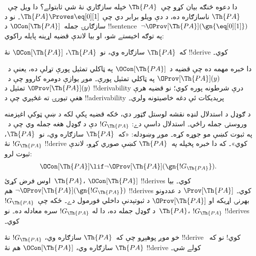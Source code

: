 \documentclass[../../../include/open-logic-section]{subfiles}
\begin{document}


دا دعوه څنګه بيان کړو چې~$\Th{PA}$ خپله سازګاري نۀ شي ثابتولے؟
دا ويل چې~$\Th{PA}$ ناسازګاره ده، د دې ويلو برابر دي چې
$\Th{PA} \Proves \eq[0][1]$۔ نو د سازګارۍ جمله~$\OCon[\Th{PA}]$
د !!{sentence}~$\lnot
\OProv[\Th{PA}](\gn{\eq[0][1]})$ په توګه اخيستے شو، او بيا
لاندې قضيه اړينه پايله راکوي:

\begin{thm}
که~$\Th{PA}$ سازګاره وي، نو~$\Th{PA}$،
$\OCon[\Th{PA}]$ نۀ !!{derive} کوي۔
\end{thm}

دا خبره مهمه ده چې قضيه د~$\OCon[\Th{PA}]$ په ټاکلي تمثيل پورې
تړلې ده، يعنې د~$\OProv[\Th{PA}](y)$ په ټاکلي تمثيل پورې۔ موږ
يوازې دومره کاروو چې د~$\OProv[\Th{PA}](y)$ تمثيل د
!!{derivability} درې شرطونه پوره کوي؛ نو قضيه هرې هغې تيورۍ ته
غځېږي چې د !!a{derivability} پريديکات ئې دغه خاصيتونه ولري۔

د ګوډل د استدلال لنډه نقشه لوستل ګټور دي، ځکه قضيه پکې لکه د ښې
ټوکې اغېزمنه وروستۍ جمله راځي۔ استدلال داسې دے: $!G_\Th{PA}$
دې د ګوډل هغه جمله وي چې د~
په ثبوت کښې مو جوړه کړه۔ موږ وښودله: «که~$\Th{PA}$ سازګاره وي،
نو~$\Th{PA}$، $!G_\Th{PA}$ نۀ !!{derive} کوي»۔ که دا خبره
پخپله \emph{په}~$\Th{PA}$ کښې صوري کړو، لاندې ثبوت لرو:
\[
\OCon[\Th{PA}] \lif \lnot \OProv[\Th{PA}](\gn{!G_\Th{PA}}).
\]
اوس فرض کړئ~$\Th{PA}$، $\OCon[\Th{PA}]$ !!{derive}s کوي۔ بيا
$\lnot
\OProv[\Th{PA}](\gn{!G_\Th{PA}})$ هم !!{derive}s کوي۔
$\Prov[\Th{PA}]$ د عددونو بهرنۍ اړيکه او $\OProv[\Th{PA}]$ د ثبوتېدنې داخلي فورمول دے۔ ځکه چې~$!G_\Th{PA}$ د ګوډل جمله ده، دا له
$!G_\Th{PA}$ سره معادله ده۔ نو~$\Th{PA}$، $!G_\Th{PA}$
!!{derive}s کوي۔

خو موږ پوهېږو چې که~$\Th{PA}$ سازګاره وي، $!G_\Th{PA}$ نۀ
!!{derive} کوي!{} نو که~$\Th{PA}$ سازګاره وي،
$\OCon[\Th{PA}]$ هم نۀ !!{derive} کولے شي۔
\end{document}
